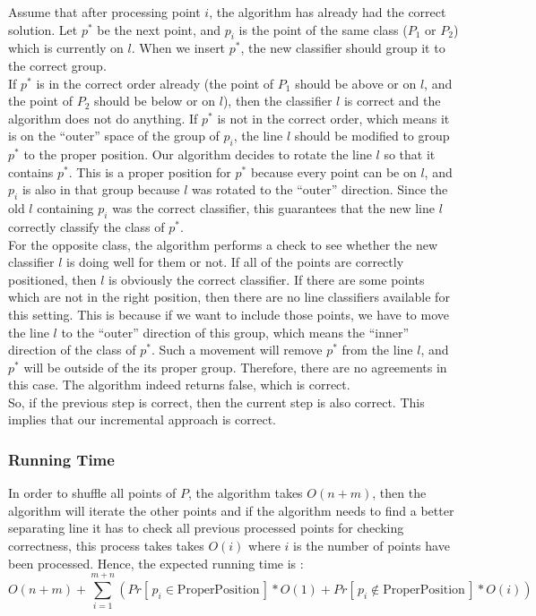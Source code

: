 Assume that after processing point $i$, the algorithm has already had the correct solution. Let $p^*$ be the next point, and $p_i$ is the point of the same class ($P_1$ or $P_2$) which is 
currently on $l$.  When we insert $p^*$, the new classifier should group it to the correct group. \\

If $p^*$ is in the correct order already (the point of $P_1$ should be above or on $l$, and the point of $P_2$ should be below or on $l$), then the classifier $l$ is correct and
the algorithm does not do anything. If $p^*$ is not in the correct order, which means it is on the ``outer'' space of the group of $p_i$, the line $l$ should be modified to group $p^*$ to the proper position. Our algorithm decides to rotate the line $l$ so that it contains $p^*$. This is a proper position for $p^*$ because every point can be on $l$, and $p_i$ is also in that group because $l$ was rotated to the ``outer'' direction. Since the old $l$ containing $p_i$ was the correct classifier, this guarantees that the new line $l$ correctly classify the class of $p^*$. \\ 

For the opposite class, the algorithm performs a check to see whether the new classifier $l$ is doing well for them or not. If all of the points are correctly positioned, then $l$ is obviously the correct classifier. If there are some points which are not in the right position, then there are no line classifiers available for this setting. This is because if we want to include those points, we have to move the line $l$ to the ``outer'' direction of this group, which means the ``inner'' direction of the class of $p^*$. Such a movement will remove $p^*$ from the line $l$, and $p^*$ will be outside of the its proper group. Therefore, there are no agreements in this case. The algorithm indeed returns false, which is correct. \\

So, if the previous step is correct, then the current step is also correct. This implies that our incremental approach is correct. \\

\subsubsection*{Running Time}
In order to shuffle all points of $P$, the algorithm takes $O(n+m)$, then the algorithm
will iterate the other points and if the algorithm needs to find a better separating line
it has to check all previous processed points for checking correctness, this process takes
takes $O(i)$ where $i$ is the number of points have been processed. Hence, the expected running time is :
$$
O(n+m) + \sum_{i=1}^{m+n}{ ( Pr[\,p_i \in \text{ProperPosition}\,]*O(1)
    + Pr[\,p_i \not\in \text{ProperPosition}\,]*O(i)
) }
$$

